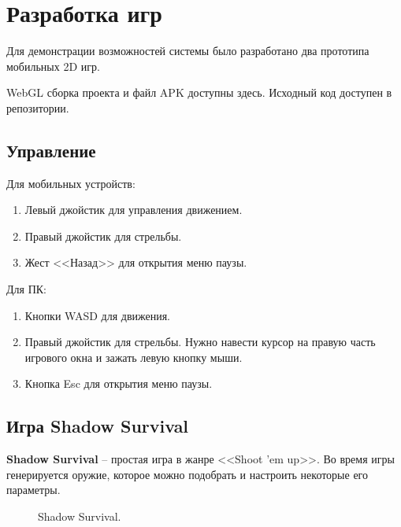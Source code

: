 ﻿%
\section{Разработка игр}

Для демонстрации возможностей системы было разработано два прототипа мобильных 2D игр. 

WebGL сборка проекта и файл APK доступны здесь\cite{s9}. Исходный код доступен в репозитории\cite{s7}.

\subsection{Управление}

{\parindent0pt Для мобильных устройств:}
\begin{enumerate}[label=\textbullet]
    \item Левый джойстик для управления движением.
    \item Правый джойстик для стрельбы.
    \item Жест <<Назад>> для открытия меню паузы.
\end{enumerate}
{\parindent0pt Для ПК:}
\begin{enumerate}[label=\textbullet]
    \item Кнопки WASD для движения.
    \item Правый джойстик для стрельбы. Нужно навести курсор на правую часть игрового окна и зажать левую кнопку мыши.
    \item Кнопка Esc для открытия меню паузы.
\end{enumerate}

\subsection{Игра Shadow Survival}

\textbf{Shadow Survival} -- простая игра в жанре <<Shoot ’em up>>. Во время игры генерируется оружие, которое можно подобрать и настроить некоторые его параметры.

\begin{figure}[ht]
    \begin{center}

        \caption{
            \label{ShadowSurvival}
            Shadow Survival.
        }
    \end {center}
\end {figure}


